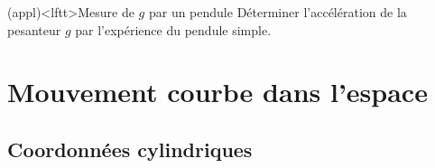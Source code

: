 \documentclass[../../main/main.tex]{subfiles}
\begin{document}
\begin{tcb*}(appl)<lftt>{Mesure de $g$ par un pendule}
	Déterminer l'accélération de la pesanteur $g$ par l'expérience du pendule
	simple.
	\tcblower
	\vspace{-35pt}
\end{tcb*}

\section{Mouvement courbe dans l'espace}
\subsection{Coordonnées cylindriques}

\end{document}
